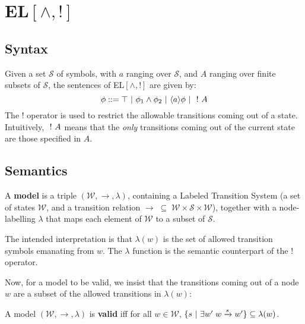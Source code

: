 \section{EL$[\land, !]$}
\subsection{Syntax}
Given a set $\mathcal{S}$ of symbols, with $a$ ranging over $\mathcal{S}$, and $A$ ranging over finite subsets of $\mathcal{S}$, the sentences of EL$[\land, !]$ are given by:
\[
\phi ::= \top \ | \  \phi_1 \land \phi_2  \ | \  \langle a \rangle \phi \ | \  \ ! \  A 
\]
The $!$ operator is used to restrict the allowable transitions coming out of a state.
Intuitively, $\ ! \  A$ means that the \emph{only} transitions coming out of the current state are those specified in $A$.
\subsection{Semantics}
\begin{definition}
A {\bf model} is a triple $(\mathcal{W}, \rightarrow, \lambda)$, containing a Labeled Transition System (a set of states $\mathcal{W}$, and a transition relation $\rightarrow \; \subseteq \; \mathcal{W} \times \mathcal{S} \times \mathcal{W}$), together with a node-labelling $\lambda$ that maps each element of $\mathcal{W}$ to a subset of $\mathcal{S}$. 
\end{definition}
The intended interpretation is that $\lambda(w)$ is the set of allowed transition symbols emanating from $w$.
The $\lambda$ function is the semantic counterpart of the $!$ operator.

Now, for a model to be valid, we insist that the transitions coming out of a node $w$ are a subset of the allowed transitions in $\lambda(w)$:
\begin{definition}
A model $(\mathcal{W}, \rightarrow, \lambda)$ is {\bf valid} iff for all $w \in \mathcal{W}$, $ \{s \ | \  \exists w' \; w \xrightarrow{s} w'\} \subseteq \lambda(w)$.
\end{definition}

